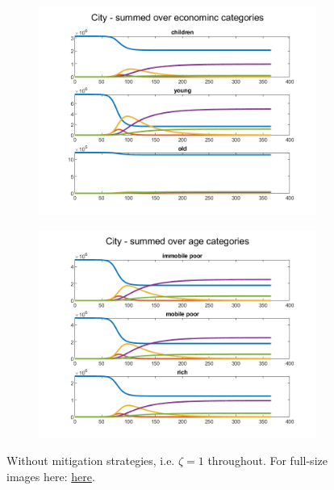 \documentclass{article}
\begin{document}
\begin{figure}[H]
	\begin{subfigure}[b]{0.5\textwidth}
		\includegraphics[width=\textwidth]{no-economic-effect/no-mitigation/City-age-cat}
	\end{subfigure}%
	\begin{subfigure}[b]{0.5\textwidth}
		\includegraphics[width=\textwidth]{no-economic-effect/no-mitigation/City-eco-cat}
	\end{subfigure}

	\caption{Without mitigation strategies, i.e. $\zeta = 1$ throughout. For full-size images here: \url{here}.}
\end{figure}
\end{document}
